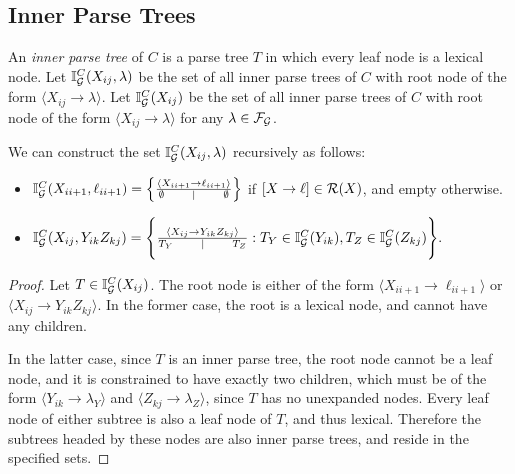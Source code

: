 \subsection{Inner Parse Trees}

\begin{defn}
  An \emph{inner parse tree} of $C$ is a parse tree $T$ in which every
  leaf node is a lexical node. Let $\mathbb{I}_{{\mathcal G}}^C(X_{ij}, \lambda)$ be
  the set of all inner parse trees of $C$ with root node of the form
  $\langle X_{ij} \to \lambda \rangle$. Let $\mathbb{I}_{{\mathcal G}}^C(X_{ij})$ be
  the set of all inner parse trees of $C$ with root node of the form
  $\langle X_{ij} \to \lambda \rangle$ for any $\lambda \in {\mathcal F}_{{\mathcal G}}$.
\end{defn}

\begin{prop}
\label{prop-induct-inside}
We can construct the set $\mathbb{I}_{{\mathcal G}}^C(X_{ij}, \lambda)$ recursively
as follows:
\begin{itemize}
\item $\mathbb{I}_{{\mathcal G}}^C(X_{i i+1}, \ell_{i i+1}) = \left\{ \frac{ \langle
      X_{i i+1} \to \ell_{i i+1} \rangle}{ \emptyset \qquad \mid
      \qquad \emptyset } \right\}$
if $[X\to \ell] \in {\mathcal R}(X)$, and empty otherwise.
\item 
$    \mathbb{I}_{{\mathcal G}}^C(X_{ij}, Y_{ik} Z_{kj}) = \Bigg\{ \frac{\langle
  X_{ij} \to Y_{ik}Z_{kj} \rangle}{ T_Y \qquad \mid \qquad T_Z} : 
 T_Y\in
      \mathbb{I}_{{\mathcal G}}^C(Y_{ik}), T_Z \in \mathbb{I}_{{\mathcal G}}^C(Z_{kj}) \Bigg\}.
$
\end{itemize}
\end{prop}
\begin{proof}
  Let $T\in \mathbb{I}_{{\mathcal G}}^C(X_{ij})$. The root node is either of the
  form $\langle X_{i i+1} \to \ell_{i i+1}\rangle$ or $\langle X_{i
    j}\to Y_{i k} Z_{k j}\rangle$. In the former case, the root is a lexical
  node, and cannot have any children.

  In the latter case, since $T$ is an inner parse tree, the root node
  cannot be a leaf node, and it is constrained to have exactly two
  children, which must be of the form $\langle Y_{ik}\to
  \lambda_Y\rangle$ and $\langle Z_{kj} \to \lambda_Z \rangle$, since
  $T$ has no unexpanded nodes. Every leaf node of either subtree is
  also a leaf node of $T$, and thus lexical. Therefore the subtrees
  headed by these nodes are also inner parse trees, and reside in the
  specified sets.
\end{proof}

